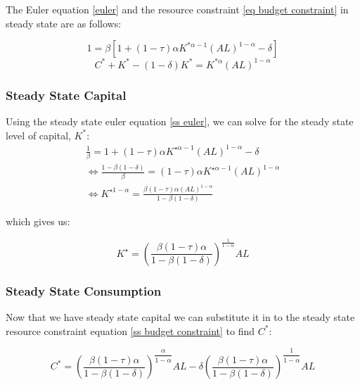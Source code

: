 \documentclass[11pt]{article}
\begin{document}
\begin{shaded}
    The Euler equation \eqref{euler} and the resource constraint \eqref{eq budget constraint} in steady state are as follows:

    \begin{equation}
        \label{ss euler}
        1 = \beta\left[1 + (1-\tau) \alpha K^{*\alpha-1} (AL)^{1-\alpha} - \delta \right]
    \end{equation}
    \begin{equation}
        \label{ss budget constraint}
        C^* + K^* - (1-\delta)K^* = K^{*\alpha} (AL)^{1-\alpha}
    \end{equation}
\end{shaded}

\subsubsection{Steady State Capital}

Using the steady state euler equation \eqref{ss euler}, we can solve for the steady state level of capital, $K^*$:
\begin{equation}
\begin{array}{r}
\frac{1}{\beta}=1+(1-\tau) \alpha K^{\star \alpha-1}(A L)^{1-\alpha}-\delta \\
\Leftrightarrow \frac{1-\beta(1-\delta)}{\beta}=(1-\tau) \alpha K^{\star \alpha-1}(A L)^{1-\alpha} \\
\Leftrightarrow K^{\star 1-\alpha}=\frac{\beta(1-\tau) \alpha(A L)^{1-\alpha}}{1-\beta(1-\delta)}
\end{array}
\end{equation}

which gives us:
\begin{mdframed}
    \begin{equation}
\label{ss capital}
K^{\star}=\left(\frac{\beta(1-\tau) \alpha}{1-\beta(1-\delta)}\right)^{\frac{1}{1-\alpha}} A L
\end{equation}
\end{mdframed}

\subsubsection{Steady State Consumption}

Now that we have steady state capital we can substitute it in to the steady state resource constraint equation \eqref{ss budget constraint} to find $C^*$:

\begin{mdframed}
    \begin{equation}
        \label{ss consumption}
        C^* = \left(\dfrac{\beta(1-\tau)\alpha}{1-\beta(1-\delta)}\right)^{\dfrac{\alpha}{1-\alpha}}AL-\delta\left(\dfrac{\beta(1-\tau)\alpha}{1-\beta(1-\delta)}\right)^{\dfrac{1}{1-\alpha}}AL
    \end{equation}
\end{mdframed}
\end{document}
